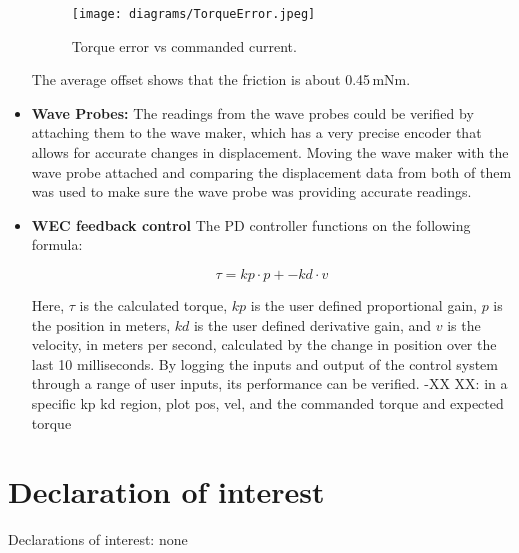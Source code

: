 \documentclass[11pt, letterpaper]{article}
\begin{document}
\begin{itemize}
\begin{figure}[tb]
  \centering
  \texttt{[image: diagrams/TorqueError.jpeg]}
  \caption{Torque error vs commanded current.}
  \label{fig:TorqueError}
\end{figure}

The average offset shows that the friction is about 0.45\,mNm.

\item \textbf{Wave Probes:}
The readings from the wave probes could be verified by attaching them to the wave maker, which has a very precise encoder that allows for accurate changes in displacement. 
Moving the wave maker with the wave probe attached and comparing the displacement data from both of them was used to make sure the wave probe was providing accurate readings. 
\item \textbf{WEC feedback control}
The PD controller functions on the following formula:

\begin{equation}
  \tau = kp \cdot p + -kd \cdot v
\end{equation}

\noindent{}Here, $\tau$ is the calculated torque, $kp$ is the user defined proportional gain, $p$ is the position in meters, $kd$ is the user defined derivative gain, and $v$ is the velocity, in meters per second, calculated by the change in position over the last 10 milliseconds. 
By logging the inputs and output of the control system through a range of user inputs, its performance can be verified. -XX
XX: in a specific kp kd region, plot pos, vel, and the commanded torque and expected torque
\end{itemize}

\section{Declaration of interest}
Declarations of interest: none
\end{document}
